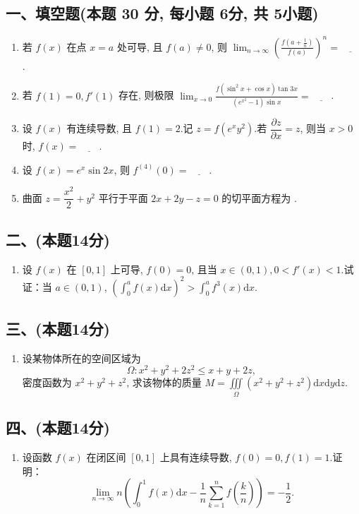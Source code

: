 \subsection*{一、填空题(本题 30 分,  每小题 6分,  共 5小题)}
\begin{enumerate}
    \item 若 $f(x)$ 在点 $x = a$ 处可导,  且 $f(a) \neq 0$,  则 $\displaystyle\lim_{n \to \infty} \left( \frac{f\left(a + \frac{1}{n}\right)}{f(a)} \right)^n = \underline{\quad\quad}$.
    \item 若 $f(1) = 0,  f'(1)$ 存在,  则极限 $\displaystyle\lim_{x \to 0} \frac{f\left(\sin^2 x + \cos x\right) \tan 3x}{(e^{x^2} - 1) \sin x} = \underline{\quad\quad}$.
    \item 设 $f(x)$ 有连续导数,  且 $f(1) = 2$.记 $z = f\left(e^x y^2\right)$.若 $\dfrac{\partial z}{\partial x} = z$,  则当 $x > 0$ 时,  $f(x) = \underline{\quad\quad}$.
    \item 设 $f(x) = e^x \sin 2x$,  则 $f^{(4)}(0) = \underline{\quad\quad}$.
    \item 曲面 $z = \dfrac{x^2}{2} + y^2$ 平行于平面 $2x + 2y - z = 0$ 的切平面方程为 \underline{\quad\quad}.
\end{enumerate}

\subsection*{二、(本题14分)}
\begin{enumerate}[start=6]
    \item 设 $f(x)$ 在 $[0, 1]$ 上可导,  $f(0) = 0$,  且当 $x \in (0, 1),  0 < f'(x) < 1$.试证：当 $a \in (0, 1)$,  $\left( \displaystyle\int_0^a f(x)  \mathrm{d}x \right)^2 > \displaystyle\int_0^a f^3(x)  \mathrm{d}x$.
\end{enumerate}

\subsection*{三、(本题14分)}
\begin{enumerate}[start=7]
    \item 设某物体所在的空间区域为
          \[
              \Omega: x^2 + y^2 + 2z^2 \leq x + y + 2z,
          \]
          密度函数为 $x^2 + y^2 + z^2$,  求该物体的质量 $M = \displaystyle\iiint\limits_{\Omega} (x^2 + y^2 + z^2)  \mathrm{d}x  \mathrm{d}y  \mathrm{d}z$.
\end{enumerate}

\subsection*{四、(本题14分)}
\begin{enumerate}[start=8]
    \item 设函数 $f(x)$ 在闭区间 $[0, 1]$ 上具有连续导数,  $f(0) = 0,  f(1) = 1$.证明：
          \[
              \lim_{n \to \infty} n \left( \int_0^1 f(x)  \mathrm{d}x - \frac{1}{n} \sum_{k=1}^n f\left( \frac{k}{n} \right) \right) = -\frac{1}{2}.
          \]
\end{enumerate}

